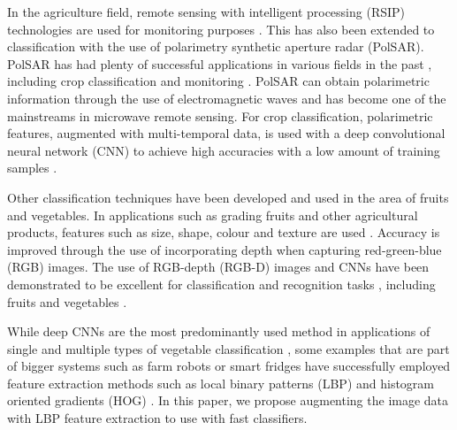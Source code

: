 In the agriculture field, remote sensing with intelligent processing (RSIP) technologies are used for monitoring purposes \cite{b2_1}. This has also been extended to classification with the use of polarimetry synthetic aperture radar (PolSAR). PolSAR has had plenty of successful applications in various fields in the past \cite{b2_2,b2_3,b2_4}, including crop classification and monitoring \cite{b2_5,b2_6}. PolSAR can obtain polarimetric information through the use of electromagnetic waves and has become one of the mainstreams in microwave remote sensing. For crop classification, polarimetric features, augmented with multi-temporal data, is used with a deep convolutional neural network (CNN) to achieve high accuracies with a low amount of training samples \cite{b2_7}.

Other classification techniques have been developed and used in the area of fruits and vegetables. In applications such as grading fruits and other agricultural products, features such as size, shape, colour and texture are used \cite{b2_8,b2_9,b2_10}. Accuracy is improved through the use of incorporating depth when capturing red-green-blue (RGB) images. The use of RGB-depth (RGB-D) images and CNNs have been demonstrated to be excellent for classification and recognition tasks \cite{b2_11,b2_12}, including fruits and vegetables \cite{b2_13}.

While deep CNNs are the most predominantly used method in applications of single and multiple types of vegetable classification \cite{b2_14,b2_15,b2_16}, some examples that are part of bigger systems such as farm robots \cite{b2_17} or smart fridges \cite{b2_18} have successfully employed feature extraction methods such as local binary patterns (LBP) and histogram oriented gradients (HOG) \cite{b2_19,b2_20}. In this paper, we propose augmenting the image data with LBP feature extraction to use with fast classifiers.